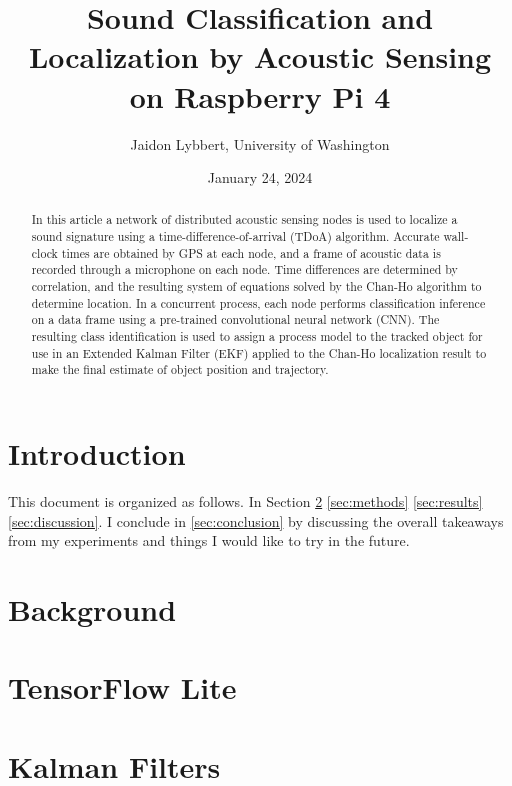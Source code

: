 \documentclass[12pt]{article}
\begin{document}
\title{Sound Classification and Localization by Acoustic Sensing on Raspberry Pi 4}
\author{Jaidon Lybbert, University of Washington}
\date{January 24, 2024}

\maketitle

\begin{abstract}
	In this article a network of distributed acoustic sensing nodes is used to localize a sound signature using a time-difference-of-arrival (TDoA) algorithm. Accurate wall-clock times are obtained by GPS at each node, and a frame of acoustic data is recorded through a microphone on each node. Time differences are determined by correlation, and the resulting system of equations solved by the Chan-Ho algorithm to determine location. In a concurrent process, each node performs classification inference on a data frame using a pre-trained convolutional neural network (CNN). The resulting class identification is used to assign a process model to the tracked object for use in an Extended Kalman Filter (EKF) applied to the Chan-Ho localization result to make the final estimate of object position and trajectory.
\end{abstract}

\section{Introduction}
This document is organized as follows. In Section \ref{sec:background} \ref{sec:methods} \ref{sec:results} \ref{sec:discussion}. I conclude in \ref{sec:conclusion} by discussing the overall takeaways from my experiments and things I would like to try in the future.

\section{Background}\label{sec:background}

\section{TensorFlow Lite}

\section{Kalman Filters}
\end{document}
